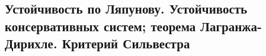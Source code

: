 

\subsection{Устойчивость по Ляпунову. Устойчивость консервативных систем; теорема Лагранжа-Дирихле. Критерий Сильвестра}



